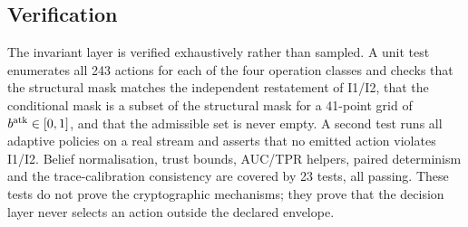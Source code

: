 \subsection{Verification}
\label{sec:verification}

The invariant layer is verified exhaustively rather than sampled. A unit test
enumerates all 243 actions for each of the four operation classes and checks
that the structural mask matches the independent restatement of I1/I2, that the
conditional mask is a subset of the structural mask for a 41-point grid of
$b^{\mathrm{atk}}\in[0,1]$, and that the admissible set is never empty. A second test
runs all adaptive policies on a real stream and asserts that no emitted action
violates I1/I2. Belief normalisation, trust bounds, AUC/TPR helpers, paired
determinism and the trace-calibration consistency are covered by 23 tests, all
passing. These tests do not prove the cryptographic mechanisms; they prove that
the decision layer never selects an action outside the declared envelope.
